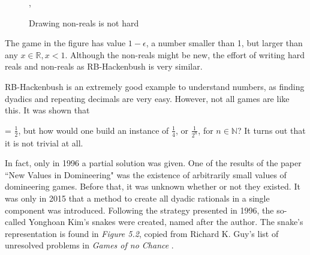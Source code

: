 \begin{figure}[H]
	\vspace{-1cm}
\begin{center}
	,
\end{center}
\caption{Drawing non-reals is not hard}
\end{figure}

The game in the figure has value $1-\epsilon$, a number smaller than 1, but larger than any $x \in \mathbb{R}, x < 1$. Although the non-reals might be new, the effort of writing hard reals and non-reals as RB-Hackenbush is very similar.

RB-Hackenbush is an extremely good example to understand numbers, as finding dyadics and repeating decimals are very easy. However, not all games are like this. It was shown that
 = $\frac{1}{2}$, but how would one build an instance of $\frac{1}{4}$, or $\frac{1}{2^n}$, for $n\in\mathbb{N}$? It turns out that it is not trivial at all.

In fact, only in 1996 a partial solution was given. One of the results of the paper ``New Values in Domineering" \cite{10} was the existence of arbitrarily small values of domineering games. Before that, it was unknown whether or not they existed. It was only in 2015 \cite{11} that a method to create all dyadic rationals in a single component was introduced. Following the strategy presented in 1996, the so-called Yonghoan Kim's snakes were created, named after the author. The snake's representation is found in \textit{Figure 5.2}, copied from Richard K. Guy's list of unresolved problems in \textit{Games of no Chance} \cite{GONC}.

